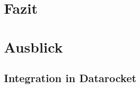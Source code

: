 \documentclass[
  language=german, %
  type=bachelor%
]{isthesis}
\begin{document}
\begin{content}
\chapter{Fazit}

\chapter{Ausblick}
 \section{Integration in Datarocket}

  

  

\end{content}



%  







\end{document}
